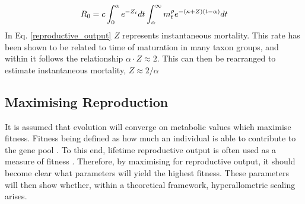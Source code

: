 \documentclass[a4paper, 11pt, hidelinks]{article} %
\begin{document}
	\begin{equation}
		\label{reproductive_output}
		R_0 = c\int_0^\alpha e^{-Z_t} dt  \int_\alpha^\infty m_t^\rho e^{-(\kappa + Z)(t - \alpha)}dt\\
	\end{equation} 
	In Eq. \ref{reproductive_output} $ Z $ represents instantaneous mortality.  This rate has been shown to be related to time of maturation in many taxon groups, and within it follows the relationship $ \alpha \cdot Z \approx  2$.  This can then be rearranged to estimate instantaneous mortality, $ Z \approx 2/\alpha  $
	
	\subsection{Maximising Reproduction}
	It is assumed that evolution will converge on metabolic values which maximise fitness. 
	Fitness being defined as how much an individual is able to contribute to the gene pool \parencite{Speakman2008, Stearns2000}.  %
	To this end, lifetime reproductive output is often used as a measure of fitness \parencite{Charnov1991, Audzijonyte2018, Speakman2008, Stearns2000, Charnov2001, Tsoukali2016, Brown1993, Charnov2007}.  Therefore, by maximising for reproductive output, it should become clear what parameters will yield the highest fitness.  These parameters will then show whether, within a theoretical framework, hyperallometric scaling arises.
	
\end{document}
